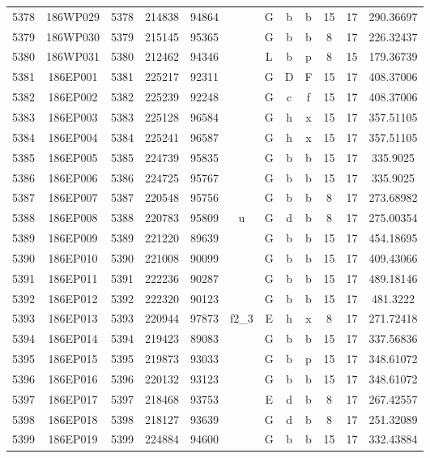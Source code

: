 \begin{tabular}{|*{12}{c|}}
5378 & 186WP029 & 5378 & 214838 & 94864 &  & G & b & b & 15 & 17 & 290.36697 \\ 
5379 & 186WP030 & 5379 & 215145 & 95365 &  & G & b & b & 8 & 17 & 226.32437 \\ 
5380 & 186WP031 & 5380 & 212462 & 94346 &  & L & b & p & 8 & 15 & 179.36739 \\ 
5381 & 186EP001 & 5381 & 225217 & 92311 &  & G & D & F & 15 & 17 & 408.37006 \\ 
5382 & 186EP002 & 5382 & 225239 & 92248 &  & G & c & f & 15 & 17 & 408.37006 \\ 
5383 & 186EP003 & 5383 & 225128 & 96584 &  & G & h & x & 15 & 17 & 357.51105 \\ 
5384 & 186EP004 & 5384 & 225241 & 96587 &  & G & h & x & 15 & 17 & 357.51105 \\ 
5385 & 186EP005 & 5385 & 224739 & 95835 &  & G & b & b & 15 & 17 & 335.9025 \\ 
5386 & 186EP006 & 5386 & 224725 & 95767 &  & G & b & b & 15 & 17 & 335.9025 \\ 
5387 & 186EP007 & 5387 & 220548 & 95756 &  & G & b & b & 8 & 17 & 273.68982 \\ 
5388 & 186EP008 & 5388 & 220783 & 95809 & u & G & d & b & 8 & 17 & 275.00354 \\ 
5389 & 186EP009 & 5389 & 221220 & 89639 &  & G & b & b & 15 & 17 & 454.18695 \\ 
5390 & 186EP010 & 5390 & 221008 & 90099 &  & G & b & b & 15 & 17 & 409.43066 \\ 
5391 & 186EP011 & 5391 & 222236 & 90287 &  & G & b & b & 15 & 17 & 489.18146 \\ 
5392 & 186EP012 & 5392 & 222320 & 90123 &  & G & b & b & 15 & 17 & 481.3222 \\ 
5393 & 186EP013 & 5393 & 220944 & 97873 & f2\_3 & E & h & x & 8 & 17 & 271.72418 \\ 
5394 & 186EP014 & 5394 & 219423 & 89083 &  & G & b & b & 15 & 17 & 337.56836 \\ 
5395 & 186EP015 & 5395 & 219873 & 93033 &  & G & b & p & 15 & 17 & 348.61072 \\ 
5396 & 186EP016 & 5396 & 220132 & 93123 &  & G & b & b & 15 & 17 & 348.61072 \\ 
5397 & 186EP017 & 5397 & 218468 & 93753 &  & E & d & b & 8 & 17 & 267.42557 \\ 
5398 & 186EP018 & 5398 & 218127 & 93639 &  & G & d & b & 8 & 17 & 251.32089 \\ 
5399 & 186EP019 & 5399 & 224884 & 94600 &  & G & b & b & 15 & 17 & 332.43884 \\ 

\end{tabular}
